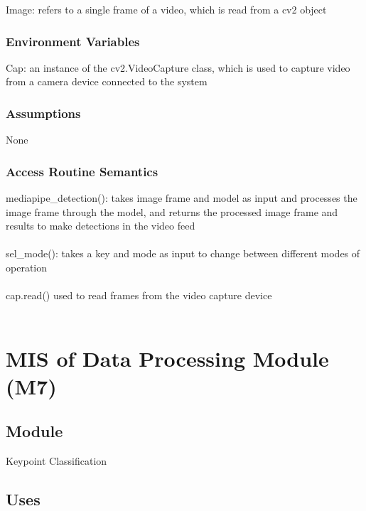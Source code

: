 \documentclass[12pt, titlepage]{article}
\begin{document}
Image: refers to a single frame of a video, which is read from a cv2 object\\

\subsubsection{Environment Variables}

Cap: an instance of the cv2.VideoCapture class, which is used to capture video from a camera device connected to the system\\

\subsubsection{Assumptions}

None\\

\subsubsection{Access Routine Semantics}

mediapipe\_detection(): takes image frame and model as input and processes the image frame through the model, and returns the processed image frame and results to make detections in the video feed\\
\\
sel\_mode(): takes a key and mode as input to change between different modes of operation\\
\\
cap.read() used to read frames from the video capture device\\

~\newpage

\section{MIS of Data Processing Module (M7)} \label{M7}

\subsection{Module}

Keypoint Classification\\

\subsection{Uses}
\end{document}
